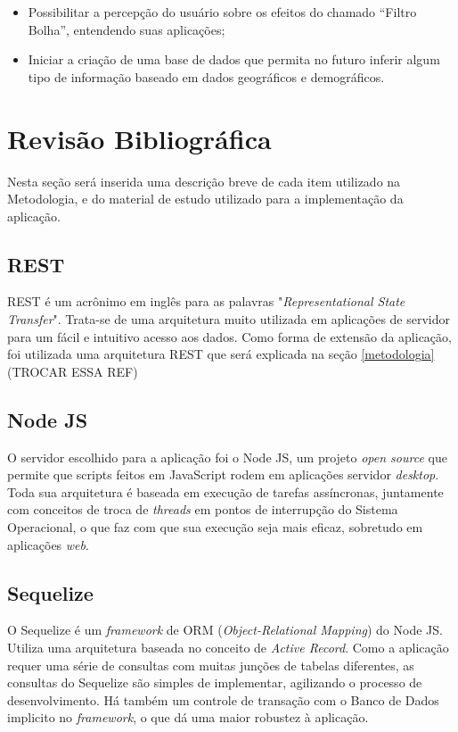 \documentclass[
	12pt,				%
	oneside,			%
	a4paper,			%
	english,			%
	brazil				%
	]{abntex2ppgsi}
\begin{document}
\begin{itemize}
	\item{Possibilitar a percepção do usuário sobre os efeitos do chamado “Filtro Bolha”, entendendo suas aplicações;}
	\item{Iniciar a criação de uma base de dados que permita no futuro inferir algum tipo de informação baseado em dados geográficos e demográficos.}
\end{itemize}


\chapter{Revisão Bibliográfica}

Nesta seção será inserida uma descrição breve de cada item utilizado na Metodologia, e do material de estudo utilizado para a implementação da aplicação.

\section{REST}
REST é um acrônimo em inglês para as palavras "\textit{Representational State Transfer}". Trata-se de uma arquitetura muito utilizada em aplicações de servidor para um fácil e intuitivo acesso aos dados. Como forma de extensão da aplicação, foi utilizada uma arquitetura REST que será explicada na seção \ref{metodologia} (TROCAR ESSA REF)

\section{Node JS}
O servidor escolhido para a aplicação foi o Node JS, um projeto \textit{open source} que permite que scripts feitos em JavaScript rodem em aplicações servidor \textit{desktop}. Toda sua arquitetura é baseada em execução de tarefas assíncronas, juntamente com conceitos de troca de \textit{threads} em pontos de interrupção do Sistema Operacional, o que faz com que sua execução seja mais eficaz, sobretudo em aplicações \textit{web}.

\section{Sequelize}
O Sequelize é um \textit{framework} de ORM (\textit{Object-Relational Mapping}) do Node JS. Utiliza uma arquitetura baseada no conceito de \textit{Active Record}. Como a aplicação requer uma série de consultas com muitas junções de tabelas diferentes, as consultas do Sequelize são simples de implementar, agilizando o processo de desenvolvimento. Há também um controle de transação com o Banco de Dados implicito no \textit{framework}, o que dá uma maior robustez à aplicação. 
\end{document}
